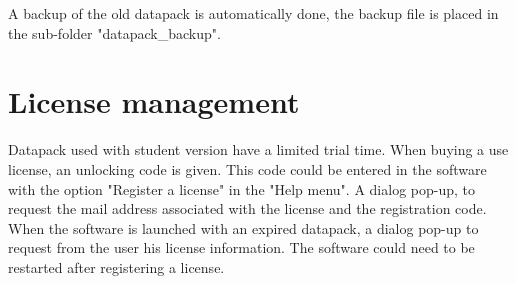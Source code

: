 A backup of the old datapack is automatically done, the backup file is placed in the sub-folder "datapack\_backup".\\

\section{License management}
Datapack used with student version have a limited trial time. When buying a use license, an unlocking code is given. This code could be entered in the software with the option "Register a license" in the "Help menu". A dialog pop-up, to request the mail address associated with the license and the registration code.\\


When the software is launched with an expired datapack, a dialog pop-up to request from the user his license information. The software could need to be restarted after registering a license. 



